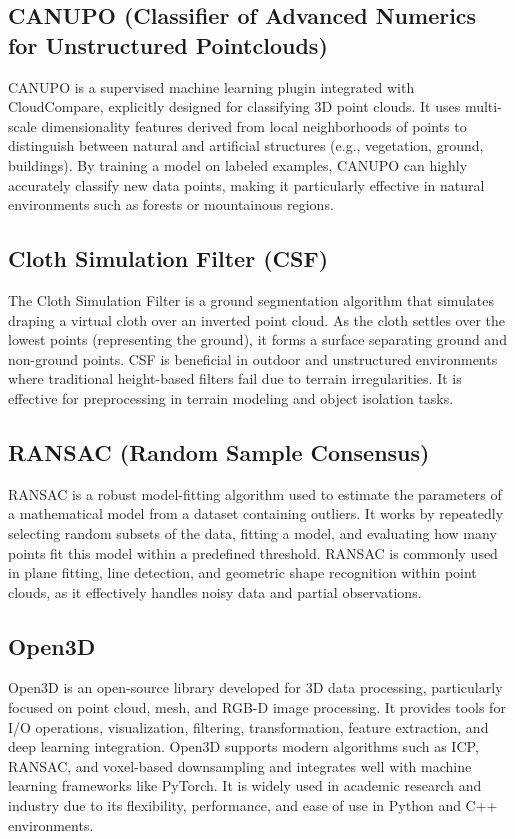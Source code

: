 \documentclass[../report.tex]{subfiles}
\begin{document}
\subsection{CANUPO (Classifier of Advanced Numerics for Unstructured Pointclouds)}

CANUPO is a supervised machine learning plugin integrated with CloudCompare, explicitly designed for classifying 3D point clouds. It uses multi-scale dimensionality features derived from local neighborhoods of points to distinguish between natural and artificial structures (e.g., vegetation, ground, buildings). By training a model on labeled examples, CANUPO can highly accurately classify new data points, making it particularly effective in natural environments such as forests or mountainous regions.

\subsection{Cloth Simulation Filter (CSF)}

The Cloth Simulation Filter\cite{ClothSF} is a ground segmentation algorithm that simulates draping a virtual cloth over an inverted point cloud. As the cloth settles over the lowest points (representing the ground), it forms a surface separating ground and non-ground points. CSF is beneficial in outdoor and unstructured environments where traditional height-based filters fail due to terrain irregularities. It is effective for preprocessing in terrain modeling and object isolation tasks.

\subsection{RANSAC (Random Sample Consensus)}

RANSAC is a robust model-fitting algorithm used to estimate the parameters of a mathematical model from a dataset containing outliers\cite{RANSAC}. It works by repeatedly selecting random subsets of the data, fitting a model, and evaluating how many points fit this model within a predefined threshold. RANSAC is commonly used in plane fitting, line detection, and geometric shape recognition within point clouds, as it effectively handles noisy data and partial observations.

\subsection{Open3D}

Open3D is an open-source library developed for 3D data processing, particularly focused on point cloud, mesh, and RGB-D image processing. It provides tools for I/O operations, visualization, filtering, transformation, feature extraction, and deep learning integration. Open3D supports modern algorithms such as ICP, RANSAC, and voxel-based downsampling and integrates well with machine learning frameworks like PyTorch. It is widely used in academic research and industry due to its flexibility, performance, and ease of use in Python and C++ environments.
\end{document}
